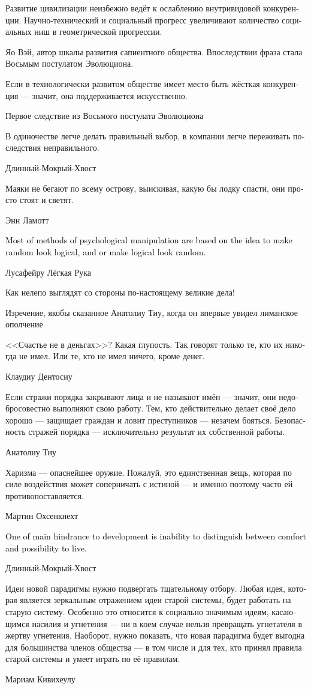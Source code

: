\documentclass[a4paper,12pt,fleqn]{book}\usepackage{cooltooltips}\usepackage{polyglossia}\setdefaultlanguage[babelshorthands=true]{russian}\setotherlanguage{english}\defaultfontfeatures{Ligatures=TeX,Mapping=tex-text} \usepackage{xcolor}\definecolor{lightgray}{HTML}{bbbbbb}\color{lightgray}\newcommand{\ml}[3]{\textenglish{\textcolor{black}{#3}}}
\begin{document}
{\epigraph
{Развитие цивилизации неизбежно ведёт к ослаблению внутривидовой конкуренции.
Научно-технический и социальный прогресс увеличивают количество социальных ниш в геометрической прогрессии.}
{Яо Вэй, автор шкалы развития сапиентного общества.
Впоследствии фраза стала Восьмым постулатом Эволюциона.}

\epigraph{Если в технологически развитом обществе имеет место быть жёсткая конкуренция --- значит, она поддерживается искусственно.}
{Первое следствие из Восьмого постулата Эволюциона}

\epigraph
{В одиночестве легче делать правильный выбор, в компании легче переживать последствия неправильного.}
{Длинный-Мокрый-Хвост}

\epigraph
{Маяки не бегают по всему острову, выискивая, какую бы лодку спасти, они просто стоят и светят.}
{Энн Ламотт}

\epigraph{
\ml{$0$}
{Большая часть методов психологической манипуляции строится на том, чтобы представить случайное закономерным, а закономерное --- случайностью.}
{Most of methods of psychological manipulation are based on the idea to make random look logical, and or make logical look random.}
}{Лусафейру Лёгкая Рука}

\epigraph
{Как нелепо выглядят со стороны по-настоящему великие дела!}
{Изречение, якобы сказанное Анатолиу Тиу, когда он впервые увидел лиманское ополчение}

\epigraph
{<<Счастье не в деньгах>>?
Какая глупость.
Так говорят только те, кто их никогда не имел.
Или те, кто не имел ничего, кроме денег.}
{Клаудиу Дентосиу}

\epigraph
{Если стражи порядка закрывают лица и не называют имён --- значит, они недобросовестно выполняют свою работу.
Тем, кто действительно делает своё дело хорошо --- защищает граждан и ловит преступников --- незачем бояться.
Безопасность стражей порядка --- исключительно результат их собственной работы.}
{Анатолиу Тиу}

\epigraph
{Харизма --- опаснейшее оружие.
Пожалуй, это единственная вещь, которая по силе воздействия может соперничать с истиной --- и именно поэтому часто ей противопоставляется.}
{Мартин Охсенкнехт}

\epigraph{
\ml{$0$}
{Один из главных тормозов развития --- неспособность различать комфорт и условия, в которых можно существовать.}
{One of main hindrance to development is inability to distinguish between comfort and possibility to live.}
}{Длинный-Мокрый-Хвост}

\epigraph
{Идеи новой парадигмы нужно подвергать тщательному отбору.
Любая идея, которая является зеркальным отражением идеи старой системы, будет работать на старую систему.
Особенно это относится к социально значимым идеям, касающимся насилия и угнетения --- ни в коем случае нельзя превращать угнетателя в жертву угнетения.
Наоборот, нужно показать, что новая парадигма будет выгодна для большинства членов общества --- в том числе и для тех, кто принял правила старой системы и умеет играть по её правилам.}
{Мариам Кивихеулу}

}
\end{document}
